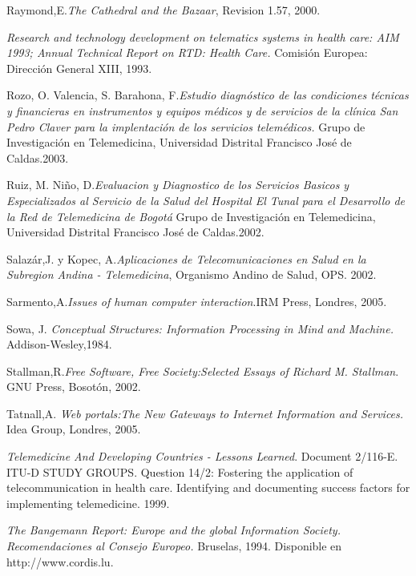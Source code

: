 \begin{thebibliography}{}
 Raymond,E.\textit{The Cathedral and the Bazaar}, Revision 1.57, 2000.

 \textit{Research and technology development on telematics systems in health care: AIM 1993; Annual Technical Report on RTD: Health Care.} Comisión Europea: Dirección General XIII, 1993.

 Rozo, O. Valencia, S. Barahona, F.\textit{Estudio diagnóstico de las condiciones técnicas y financieras en instrumentos y equipos médicos  y de servicios de la clínica San Pedro Claver para la implentación de los servicios telemédicos.} Grupo de Investigación en Telemedicina,  Universidad Distrital Francisco José de Caldas.2003.

 Ruiz, M. Niño, D.\textit{Evaluacion y Diagnostico de los Servicios Basicos y Especializados al Servicio de la Salud del Hospital El Tunal para el Desarrollo de la Red de Telemedicina de Bogotá} Grupo de Investigación en Telemedicina,  Universidad Distrital Francisco José de Caldas.2002.

 Salazár,J. y Kopec, A.\textit{Aplicaciones de Telecomunicaciones en Salud en la Subregion Andina - Telemedicina}, Organismo Andino de Salud, OPS. 2002.

 Sarmento,A.\textit{Issues of human computer interaction}.IRM Press, Londres, 2005. 

 Sowa, J. \textit{Conceptual Structures: Information Processing in Mind and Machine.} Addison-Wesley,1984.

 Stallman,R.\textit{Free Software, Free Society:Selected Essays of Richard M. Stallman}. GNU Press, Bosotón, 2002.

 Tatnall,A. \textit{Web portals:The New Gateways to Internet Information and Services.} Idea Group, Londres, 2005.

 \textit{Telemedicine And Developing Countries - Lessons Learned}. Document 2/116-E. ITU-D STUDY GROUPS. Question 14/2: Fostering the application of telecommunication in health care.  Identifying and documenting success factors for implementing telemedicine. 1999.

 \textit{The Bangemann Report: Europe and the global Information Society. Recomendaciones al Consejo Europeo.} Bruselas, 1994. Disponible en http://www.cordis.lu.


\end{thebibliography}
